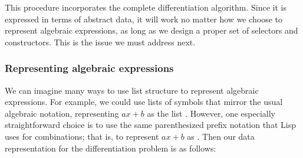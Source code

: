\noindent
This  procedure incorporates the complete differentiation
algorithm.  Since it is expressed in terms of abstract data, it will work no
matter how we choose to represent algebraic expressions, as long as we design a
proper set of selectors and constructors.  This is the issue we must address
next.

\subsubsection*{Representing algebraic expressions}

We can imagine many ways to use list structure to represent algebraic
expressions.  For example, we could use lists of symbols that mirror the usual
algebraic notation, representing \( ax + b \) as the list .  However, one especially straightforward choice is to use the same
parenthesized prefix notation that Lisp uses for combinations; that is, to
represent \( ax + b \) as .  Then our data
representation for the differentiation problem is as follows:

